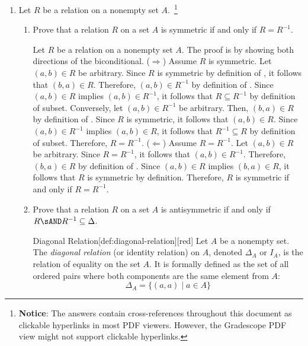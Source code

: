 \begin{enumerate}
  \newpage

  \item Let $R$ be a relation on a nonempty set $A$.~\footnote{
    \textbf{Notice}: The answers contain cross-references throughout this document as clickable hyperlinks in most PDF viewers. 
    However, the Gradescope PDF view might not support clickable hyperlinks.
  }
  \begin{enumerate}
    \item Prove that a relation $R$ on a set $A$ is symmetric if and only if $R=R^{-1}$.
      \begin{subprove}
        Let $R$ be a relation on a nonempty set $A$. 
        The proof is by showing both directions of the biconditional.
        \proofstep
        ($\Rightarrow$) Assume $R$ is symmetric. Let $(a,b) \in R$ be arbitrary. 
        Since $R$ is symmetric by definition of , it follows that $(b,a) \in R$. 
        Therefore, $(a,b) \in R^{-1}$ by definition of . 
        Since $(a,b) \in R$ implies $(a,b) \in R^{-1}$, it follows that $R \subseteq R^{-1}$ by definition of subset.
        Conversely, let $(a,b) \in R^{-1}$ be arbitrary. Then, $(b,a) \in R$ by definition of . 
        Since $R$ is symmetric, it follows that $(a,b) \in R$. 
        Since $(a,b) \in R^{-1}$ implies $(a,b) \in R$, it follows that $R^{-1} \subseteq R$ by definition of subset.
        Therefore, $R = R^{-1}$.
        \proofstep
        ($\Leftarrow$) Assume $R = R^{-1}$. Let $(a,b) \in R$ be arbitrary. 
        Since $R = R^{-1}$, it follows that $(a,b) \in R^{-1}$. 
        Therefore, $(b,a) \in R$ by definition of . 
        Since $(a,b) \in R$ implies $(b,a) \in R$, it follows that $R$ is symmetric by definition.
        \proofstep
        Therefore, $R$ is symmetric if and only if $R = R^{-1}$.
      \end{subprove}
    \item Prove that a relation $R$ on a set $A$ is antisymmetric if and only if $R \sAND R^{-1} \subseteq \Delta$.
    \begin{define}{Diagonal Relation}[def:diagonal-relation][red]
      Let $A$ be a nonempty set. The \emph{diagonal relation} (or identity relation) on $A$, denoted $\Delta_A$ or $I_A$, is the relation of equality on the set $A$. It is formally defined as the set of all ordered pairs where both components are the same element from $A$:
      $$ \Delta_A = \{ (a,a) \mid a \in A \} $$
    \end{define}

\end{enumerate}
\end{enumerate}
